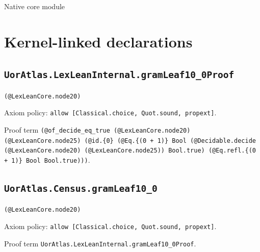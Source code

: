 \documentclass[11pt]{article}
\begin{document}
\begin{center}{\LARGE Native core module}\end{center}
\section*{Kernel-linked declarations}
\subsection*{\texttt{UorAtlas.LexLeanInternal.gramLeaf10\_0Proof}}
\noindent\texttt{(@LexLeanCore.node20)}\par
\noindent Axiom policy: \texttt{allow [Classical.choice, Quot.sound, propext]}.\par
\noindent Proof term \texttt{(@of\_decide\_eq\_true (@LexLeanCore.node20) (@LexLeanCore.node25) (@id.\{0\} (@Eq.\{(0 + 1)\} Bool (@Decidable.decide (@LexLeanCore.node20) (@LexLeanCore.node25)) Bool.true) (@Eq.refl.\{(0 + 1)\} Bool Bool.true)))}.\par
\subsection*{\texttt{UorAtlas.Census.gramLeaf10\_0}}
\noindent\texttt{(@LexLeanCore.node20)}\par
\noindent Axiom policy: \texttt{allow [Classical.choice, Quot.sound, propext]}.\par
\noindent Proof term \texttt{UorAtlas.LexLeanInternal.gramLeaf10\_0Proof}.\par
\end{document}
